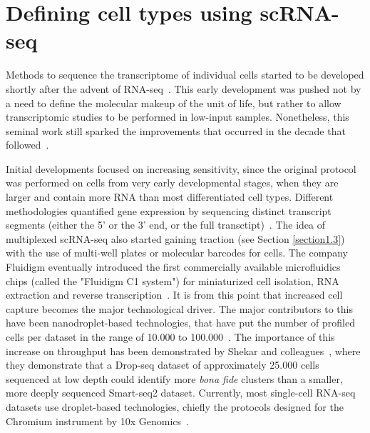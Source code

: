 \section{Defining cell types using scRNA-seq} %
\label{section1.2}

Methods to sequence the transcriptome of individual cells started to be developed shortly after the advent of RNA-seq~\citep{mortazavi_mapping_2008,tang_mrna-seq_2009}. This early development was pushed not by a need to define the molecular makeup of the unit of life, but rather to allow transcriptomic studies to be performed in low-input samples. Nonetheless, this seminal work still sparked the improvements that occurred in the decade that followed~\citep{svensson_exponential_2018}.

Initial developments focused on increasing sensitivity, since the original protocol was performed on cells from very early developmental stages, when they are larger and contain more RNA than most differentiated cell types. Different methodologies quantified gene expression by sequencing distinct transcript segments (either the 5' or the 3' end, or the full transctipt)~\citep{islam_characterization_2011,hashimshony_cel-seq:_2012,ramskold_full-length_2012,picelli_full-length_2014}. The idea of multiplexed scRNA-seq also started gaining traction (see Section \ref{section1.3}) with the use of multi-well plates or molecular barcodes for cells. The company Fluidigm eventually introduced the first commercially available microfluidics chips (called the "Fluidigm C1 system") for miniaturized cell isolation, RNA extraction and reverse transcription~\citep{brennecke_accounting_2013}. It is from this point that increased cell capture becomes the major technological driver. The major contributors to this have been nanodroplet-based technologies, that have put the number of profiled cells per dataset in the range of 10.000 to 100.000~\citep{macosko_highly_2015,klein_droplet_2015}. The importance of this increase on throughput has been demonstrated by Shekar and colleagues~\citep{shekhar_comprehensive_2016}, where they demonstrate that a Drop-seq dataset of approximately 25.000 cells sequenced at low depth could identify more \textit{bona fide} clusters than a smaller, more deeply sequenced Smart-seq2 dataset. Currently, most single-cell RNA-seq datasets use droplet-based technologies, chiefly the protocols designed for the Chromium instrument by 10x Genomics~\citep{zheng_massively_2017}. 

